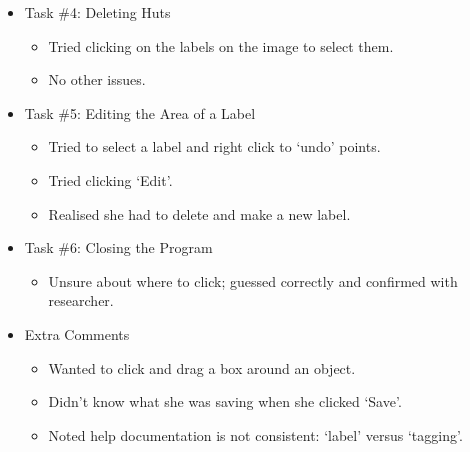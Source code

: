 \documentclass[11pt,twocolumn]{article}
\begin{document}
\begin{itemize}
\item Task \#4: Deleting Huts
\begin{itemize}
\item Tried clicking on the labels on the image to select them.
\item No other issues.
\end{itemize}
\item Task \#5: Editing the Area of a Label
\begin{itemize}
\item Tried to select a label and right click to `undo' points.
\item Tried clicking `Edit'.
\item Realised she had to delete and make a new label.
\end{itemize}
\item Task \#6: Closing the Program
\begin{itemize}
\item Unsure about where to click; guessed correctly and confirmed with researcher.
\end{itemize}
\item Extra Comments
\begin{itemize}
\item Wanted to click and drag a box around an object.
\item Didn't know what she was saving when she clicked `Save'.
\item Noted help documentation is not consistent: `label' versus `tagging'.
\end{itemize}
\end{itemize}
\end{document}
